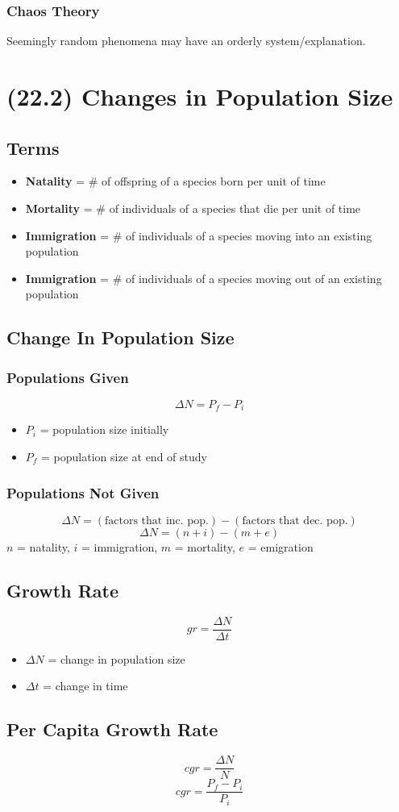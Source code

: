 \documentclass[a4paper,12pt]{article}
\begin{document}
\subsubsection{Chaos Theory}
Seemingly random phenomena may have an orderly system/explanation.

\section{(22.2) Changes in Population Size}
\subsection{Terms}
\begin{itemize}
    \item{\textbf{Natality} = \# of offspring of a species born per unit of time}
    \item{\textbf{Mortality} = \# of individuals of a species that die per unit of time}
    \item{\textbf{Immigration} = \# of individuals of a species moving into an existing population}
    \item{\textbf{Immigration} = \# of individuals of a species moving out of an existing population}
\end{itemize}

\subsection{Change In Population Size}
\subsubsection{Populations Given}
\Huge $$\Delta{N} = P_f - P_i$$ \normalsize
\begin{itemize}
    \item{$P_i$ = population size initially}
    \item{$P_f$ = population size at end of study}
\end{itemize}

\subsubsection{Populations Not Given}
$$\Delta{N} = (\textrm{factors that inc. pop.}) - (\textrm{factors that dec. pop.})$$
\Huge $$\Delta{N} = (n + i) - (m + e)$$ \normalsize
$n$ = natality, $i$ = immigration, $m$ = mortality, $e$ = emigration

\subsection{Growth Rate}
\Huge $$gr = \frac{\Delta{N}}{\Delta{t}}$$ \normalsize
\begin{itemize}
    \item{$\Delta{N}$ = change in population size}
    \item{$\Delta{t}$ = change in time}
\end{itemize}

\subsection{Per Capita Growth Rate}
\Huge 
$$cgr = \frac{\Delta{N}}{N}$$
\normalsize
$$cgr = \frac{P_f - P_i}{P_i}$$
\end{document}
